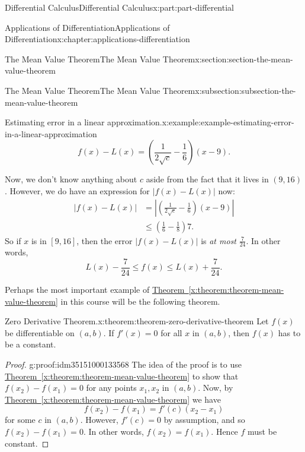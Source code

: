 \documentclass[twoside,10pt,]{book}
\newcommand{\xreffont}{\relax}
\numberwithin{equation}{part}
\begin{document}
\begin{partptx}{Differential Calculus}{}{Differential Calculus}{}{}{x:part:part-differential}
\begin{chapterptx}{Applications of Differentiation}{}{Applications of Differentiation}{}{}{x:chapter:applications-differentiation}
\begin{sectionptx}{The Mean Value Theorem}{}{The Mean Value Theorem}{}{}{x:section:section-the-mean-value-theorem}
\begin{subsectionptx}{The Mean Value Theorem}{}{The Mean Value Theorem}{}{}{x:subsection:subsection-the-mean-value-theorem}
\begin{example}{Estimating error in a linear approximation.}{x:example:example-estimating-error-in-a-linear-approximation}
\begin{equation*}
f(x) - L(x) = \left(\frac{1}{2\sqrt{c}} - \frac{1}{6}\right)(x-9).
\end{equation*}
%
\par
Now, we don't know anything about \(c\) aside from the fact that it lives in \((9,16)\). However, we do have an expression for \(|f(x) - L(x)|\) now:%
\begin{align*}
|f(x) - L(x)| & = \left|\left(\frac{1}{2\sqrt{c}} - \frac{1}{6}\right)(x-9)\right|\\
& \leq \left(\frac{1}{6} - \frac{1}{8}\right)7. 
\end{align*}
So if \(x\) is in \([9,16]\), then the error \(|f(x) - L(x)|\) is \emph{at most} \(\frac{7}{24}\). In other words,%
\begin{equation*}
L(x) - \frac{7}{24} \leq f(x) \leq L(x) + \frac{7}{24}.
\end{equation*}
%
\end{example}
Perhaps the most important example of \hyperref[x:theorem:theorem-mean-value-theorem]{Theorem~{\xreffont\ref{x:theorem:theorem-mean-value-theorem}}} in this course will be the following theorem.%
\begin{theorem}{Zero Derivative Theorem.}{}{x:theorem:theorem-zero-derivative-theorem}%
Let \(f(x)\) be differentiable on \((a,b)\). If \(f'(x) = 0\) for all \(x\) in \((a,b)\), then \(f(x)\) has to be a constant.%
\end{theorem}
\begin{proof}{}{g:proof:idm35151000133568}
The idea of the proof is to use \hyperref[x:theorem:theorem-mean-value-theorem]{Theorem~{\xreffont\ref{x:theorem:theorem-mean-value-theorem}}} to show that \(f(x_{2}) - f(x_{1}) = 0\) for any points \(x_{1},x_{2}\) in \((a,b)\). Now, by \hyperref[x:theorem:theorem-mean-value-theorem]{Theorem~{\xreffont\ref{x:theorem:theorem-mean-value-theorem}}} we have%
\begin{equation*}
f(x_{2}) - f(x_{1}) = f'(c)(x_{2}-x_{1})
\end{equation*}
for some \(c\) in \((a,b)\). However, \(f'(c) = 0\) by assumption, and so \(f(x_{2}) - f(x_{1}) = 0\). In other words, \(f(x_{2}) = f(x_{1})\). Hence \(f\) must be constant.%
\end{proof}
\end{subsectionptx}
\end{sectionptx}
%
%
\typeout{************************************************}
\typeout{************************************************}

\end{chapterptx}
\end{partptx}
\end{document}
